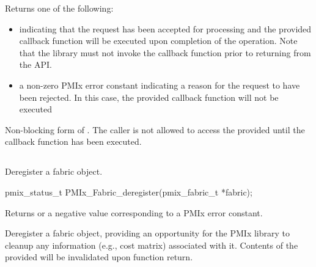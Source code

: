 Returns one of the following:

\begin{itemize}
\item {} indicating that the request has been accepted for processing and the provided callback function will be executed upon completion of the operation. Note that the library must not invoke the callback function prior to returning from the \ac{API}.
\item a non-zero \ac{PMIx} error constant indicating a reason for the request to have been rejected. In this case, the provided callback function will not be executed
\end{itemize}

\descr

Non-blocking form of . The caller is not allowed to access the provided  until the callback function has been executed.


\subsection{}

\summary

Deregister a fabric object.

\format

\cspecificstart
\begin{codepar}
pmix_status_t
PMIx_Fabric_deregister(pmix_fabric_t *fabric);
\end{codepar}
\cspecificend

\begin{arglist}
\end{arglist}

Returns  or a negative value corresponding to a \ac{PMIx} error constant.

\descr

Deregister a fabric object, providing an opportunity for the \ac{PMIx} library to cleanup any information (e.g., cost matrix) associated with it. Contents of the provided  will be invalidated upon function return.


\subsection{}

